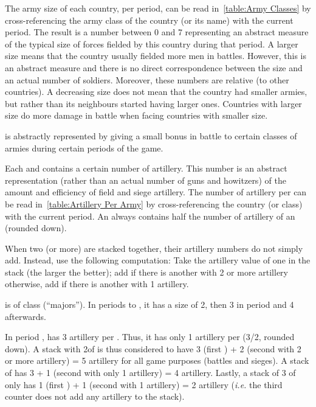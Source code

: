 
\aparag[Size.] The army size of each country, per period, can be read
in~\ref{table:Army Classes} by cross-referencing the army class of the country
(or its name) with the current period.
\bparag The result is a number between 0 and 7 representing an abstract
measure of the typical size of forces fielded by this country during that
period.
\bparag A larger size means that the country usually fielded more men in
battles. However, this is an abstract measure and there is no direct
correspondence between the size and an actual number of soldiers. Moreover,
these numbers are relative (to other countries). A decreasing size does not
mean that the country had smaller armies, but rather than its neighbours
started having larger ones.
\bparag Countries with larger size do more damage in battle when facing
countries with smaller size.

\aparag[Cavalry] is abstractly represented by giving a small bonus in battle
to certain classes of armies during certain periods of the game.

\aparag[Artillery.] Each \ARMY\facemoins and \ARMY\faceplus contains a certain
number of artillery. This number is an abstract representation (rather than an
actual number of guns and howitzers) of the amount and efficiency of field and
siege artillery.
\bparag The number of artillery per \ARMY\faceplus can be read
in~\ref{table:Artillery Per Army} by cross-referencing the country (or class)
with the current period.
\bparag An \ARMY\facemoins always contains half the number of artillery of an
\ARMY\faceplus (rounded down).


 When two (or more) \ARMY are stacked together,
their artillery numbers do not simply add. Instead, use the following
computation:
\bparag Take the artillery value of one \ARMY in the stack (the larger the
better); add  if there is another \ARMY with 2 or more artillery
otherwise, add  if there is another \ARMY with 1 artillery.

\begin{exemple}
  \FRA is of class \CAIV (``majors''). In periods  to ,
  it has a size of 2, then 3 in period  and 4 afterwards.

  In period , \FRA has 3 artillery per \ARMY\faceplus. Thus, it has
  only 1 artillery per \ARMY\facemoins (3/2, rounded down). A stack with
  2\ARMY\faceplus of \FRA is thus considered to have 3 (first \ARMY) + 2
  (second \ARMY with 2 or more artillery) = 5 artillery for all game purposes
  (battles and sieges). A stack of \ARMY\faceplus \ARMY\facemoins has 3 + 1
  (second \ARMY with only 1 artillery) = 4 artillery. Lastly, a stack of 3
  \ARMY\facemoins of \FRA only has 1 (first \ARMY) + 1 (second \ARMY with 1
  artillery) = 2 artillery (\emph{i.e.} the third \ARMY counter does not add
  any artillery to the stack).
\end{exemple}



